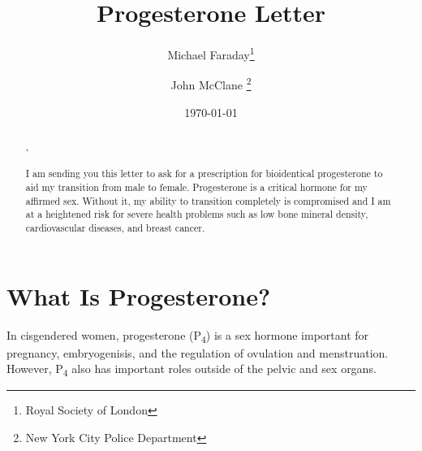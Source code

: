 \documentclass[
	secnumdepth=3, %
]{kaohandt}
\newcommand\tsub[1]{\textsubscript{#1}}
\begin{document}

\title[Progesterone Letter]{Progesterone Letter}

\author[MF, JMC]{Michael Faraday\thanks{Royal Society of London} \and John McClane \thanks{New York City Police Department}}

\date{\today}




\begin{abstract}
,\\\\
I am sending you this letter to ask for a prescription for bioidentical progesterone to aid my transition from male to female. Progesterone is a critical hormone for my affirmed sex. Without it, my ability to transition completely is compromised and I am at a heightened risk for severe health problems such as low bone mineral density, cardiovascular diseases, and breast cancer.
\end{abstract}


\medskip


\section{What Is Progesterone?}

In cisgendered women, progesterone (P\tsub{4}) is a sex hormone important for pregnancy, embryogenisis, and the regulation of ovulation and menstruation. However, P\tsub{4} also has important roles outside of the pelvic and sex organs.
\end{document}

